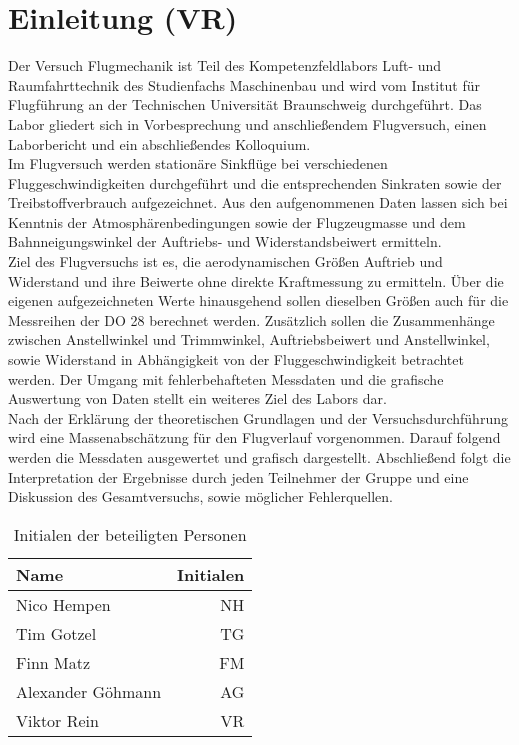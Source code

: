\chapter{Einleitung (VR)}
\label{c:Einleitung}

Der Versuch Flugmechanik ist Teil des Kompetenzfeldlabors Luft- und Raumfahrttechnik des Studienfachs Maschinenbau und wird vom Institut für Flugführung an der Technischen Universität Braunschweig durchgeführt. Das Labor gliedert sich in Vorbesprechung und anschließendem Flugversuch, einen Laborbericht und ein abschließendes Kolloquium. \\
Im Flugversuch werden stationäre Sinkflüge bei verschiedenen Fluggeschwindigkeiten durchgeführt und die entsprechenden Sinkraten sowie der Treibstoffverbrauch aufgezeichnet. Aus den aufgenommenen Daten lassen sich bei Kenntnis der Atmosphärenbedingungen sowie der Flugzeugmasse und dem Bahnneigungswinkel der Auftriebs- und Widerstandsbeiwert ermitteln. \\
Ziel des Flugversuchs ist es, die aerodynamischen Größen Auftrieb und Widerstand und ihre Beiwerte ohne direkte Kraftmessung zu ermitteln. Über die eigenen aufgezeichneten Werte hinausgehend sollen dieselben Größen auch für die Messreihen der DO 28 berechnet werden. Zusätzlich sollen die Zusammenhänge zwischen Anstellwinkel und Trimmwinkel, Auftriebsbeiwert und Anstellwinkel, sowie Widerstand in Abhängigkeit von der Fluggeschwindigkeit betrachtet werden. Der Umgang mit fehlerbehafteten Messdaten und die grafische Auswertung von Daten stellt ein weiteres Ziel des Labors dar. \\
Nach der Erklärung der theoretischen Grundlagen und der Versuchsdurchführung wird eine Massenabschätzung für den Flugverlauf vorgenommen. Darauf folgend werden die Messdaten ausgewertet und grafisch dargestellt. Abschließend folgt die Interpretation der Ergebnisse durch jeden Teilnehmer der Gruppe und eine Diskussion des Gesamtversuchs, sowie möglicher Fehlerquellen. 






\begin{table}[h]
	\centering
	\begin{tabular}{lr}
		
		Name & \hspace{0.5cm} Initialen\\
		\hline
		Nico Hempen & NH\\
		Tim Gotzel & TG\\
		Finn Matz & FM\\
		Alexander Göhmann & AG \\
		Viktor Rein & VR\\
		\hline
		
	\end{tabular}
	\caption{Initialen der beteiligten Personen}
	\label{tab:initialien}
\end{table}
